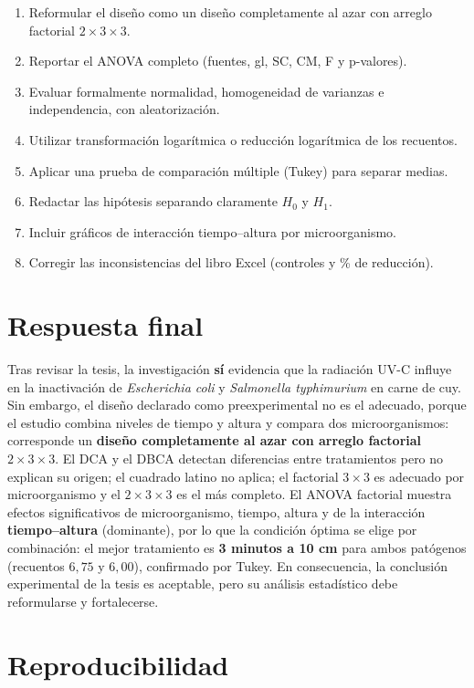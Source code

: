 \documentclass[12pt,a4paper]{article}
\begin{document}
\begin{enumerate}
    \item Reformular el diseño como un diseño completamente al azar con arreglo factorial $2\times3\times3$.
    \item Reportar el ANOVA completo (fuentes, gl, SC, CM, F y p-valores).
    \item Evaluar formalmente normalidad, homogeneidad de varianzas e independencia, con aleatorización.
    \item Utilizar transformación logarítmica o reducción logarítmica de los recuentos.
    \item Aplicar una prueba de comparación múltiple (Tukey) para separar medias.
    \item Redactar las hipótesis separando claramente $H_0$ y $H_1$.
    \item Incluir gráficos de interacción tiempo--altura por microorganismo.
    \item Corregir las inconsistencias del libro Excel (controles y \% de reducción).
\end{enumerate}

\section{Respuesta final}

Tras revisar la tesis, la investigación \textbf{sí} evidencia que la radiación UV-C influye en la inactivación de \textit{Escherichia coli} y \textit{Salmonella typhimurium} en carne de cuy. Sin embargo, el diseño declarado como preexperimental no es el adecuado, porque el estudio combina niveles de tiempo y altura y compara dos microorganismos: corresponde un \textbf{diseño completamente al azar con arreglo factorial $2\times3\times3$}. El DCA y el DBCA detectan diferencias entre tratamientos pero no explican su origen; el cuadrado latino no aplica; el factorial $3\times3$ es adecuado por microorganismo y el $2\times3\times3$ es el más completo. El ANOVA factorial muestra efectos significativos de microorganismo, tiempo, altura y de la interacción \textbf{tiempo--altura} (dominante), por lo que la condición óptima se elige por combinación: el mejor tratamiento es \textbf{3 minutos a 10 cm} para ambos patógenos (recuentos $6{,}75$ y $6{,}00$), confirmado por Tukey. En consecuencia, la conclusión experimental de la tesis es aceptable, pero su análisis estadístico debe reformularse y fortalecerse.

\section*{Reproducibilidad}
\end{document}
